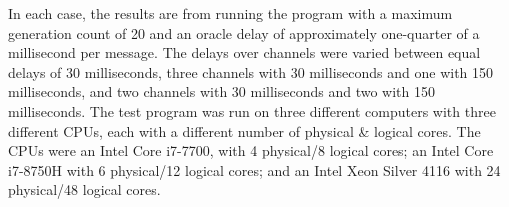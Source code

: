 In each case, the results are from running the program with a maximum generation count of 20 and an oracle delay of approximately one-quarter of a millisecond per message.  The delays over channels were varied between equal delays of 30 milliseconds, three channels with 30 milliseconds and one with 150 milliseconds, and two channels with 30 milliseconds and two with 150 milliseconds.  The test program was run on three different computers with three different CPUs, each with a different number of physical \& logical cores.  The CPUs were an Intel\textsuperscript{\textregistered} Core\textsuperscript{\texttrademark} i7-7700, with 4 physical/8 logical cores; an Intel\textsuperscript{\textregistered} Core\textsuperscript{\texttrademark} i7-8750H with 6 physical/12 logical cores; and an Intel\textsuperscript{\textregistered} Xeon\textsuperscript{\textregistered} Silver 4116 with 24 physical/48 logical cores.

\begin{table}
\centering
{}
\caption[Mean recorded running times for each \acrlong{nmp} variant]{Mean recorded running times in milliseconds for each \gls{nmp} variant in a simulation, with different sending delay lengths, on a computer with a CPU with 4/8 physical/logical cores}
\label{tab:nmp:simulation8cores}
\end{table}

